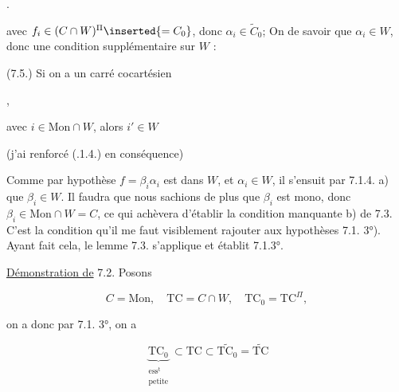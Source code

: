 .

 avec $f_i\in(C\cap W)^\Pi\inserted{=C_0}$, donc $\alpha_i\in\widetilde C_0$;  On   de savoir que $\alpha_i\in W$, donc une condition supplémentaire sur $W$ :

(7.5.) Si on a un carré cocartésien

\hfill,

avec $i\in\mathrm{Mon}\cap W$, alors $i'\in W$


(j'ai renforcé (.1.4.) en conséquence)


Comme par hypothèse $f=\beta_i\alpha_i$ est dans $W$, et $\alpha_i\in W$, il s'ensuit par 7.1.4. a) que $\beta_i\in W$. Il faudra que nous sachions de plus que $\beta_i$ est mono, donc $\beta_i\in\mathrm{Mon}\cap W=C$, ce qui achèvera  d'établir la condition manquante b) de 7.3. C'est la condition  qu'il me faut visiblement rajouter aux hypothèses  7.1. 3°). Ayant fait cela, le lemme 7.3. s'applique et établit 7.1.3°.

\uline{Démonstration de} 7.2. Posons

\[
C=\mathrm{Mon},\quad\mathrm{TC}=C\cap W,\quad\mathrm{TC}_0=\mathrm{TC}^{\Pi},
\]

on a donc par 7.1. 3°, on a

\[
\underbrace{\mathrm{TC}_0}_{\substack{\text{ess}^{\mathrm{t}}\\\text{petite}}}\subset\mathrm{TC}\subset\widetilde{\mathrm{TC}_0}=\widetilde{\mathrm{TC}}
\]

